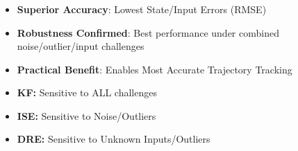 \documentclass[handout, aspectratio=169]{beamer}
\begin{document}
\begin{frame}
    \frametitle{} %
    \begin{tcolorbox}[colbacktitle=title1, title=\textbf{DRISE Performance}] %
        \begin{itemize}
            \item<1-> \textbf{Superior Accuracy}: Lowest State/Input Errors (RMSE) \pause
            \item<2-> \textbf{Robustness Confirmed}: Best performance under combined noise/outlier/input challenges \pause
            \item<3-> \textbf{Practical Benefit}: Enables Most Accurate Trajectory Tracking
        \end{itemize}
    \end{tcolorbox}
    \pause %
    \begin{tcolorbox}[colbacktitle=redtitle, title=\textbf{Benchmark Limits}]
        \begin{itemize} %
            \item<5-> \textbf{KF:} Sensitive to ALL challenges \pause %
            \item<6-> \textbf{ISE:} Sensitive to Noise/Outliers \pause
            \item<7-> \textbf{DRE:} Sensitive to Unknown Inputs/Outliers
        \end{itemize}
    \end{tcolorbox}
\end{frame}
\end{document}
